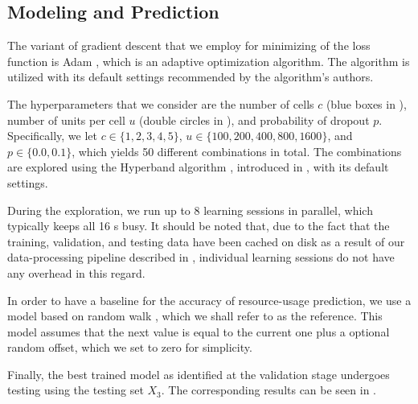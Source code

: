 \subsection{Modeling and Prediction}
The variant of gradient descent that we employ for minimizing of the loss
function is Adam \cite{kingma2014}, which is an adaptive optimization algorithm.
The algorithm is utilized with its default settings recommended by the
algorithm's authors.

The hyperparameters that we consider are the number of cells $c$ (blue boxes in
), number of units per cell $u$ (double circles in ),
and probability of dropout $p$. Specifically, we let $c \in \{1, 2, 3, 4, 5\}$,
$u \in \{100, 200, 400, 800, 1600\}$, and $p \in \{0.0, 0.1\}$, which yields 50
different combinations in total. The combinations are explored using the
Hyperband algorithm \cite{li2016}, introduced in , with its
default settings.

During the exploration, we run up to 8 learning sessions in parallel, which
typically keeps all 16 s busy. It should be noted that, due to the fact
that the training, validation, and testing data have been cached on disk as a
result of our data-processing pipeline described in , individual
learning sessions do not have any overhead in this regard.


In order to have a baseline for the accuracy of resource-usage prediction, we
use a model based on random walk \cite{hastie2009}, which we shall refer to as
the reference. This model assumes that the next value is equal to the current
one plus a optional random offset, which we set to zero for simplicity.

Finally, the best trained model as identified at the validation stage undergoes
testing using the testing set $X_3$. The corresponding results can be seen in
.
